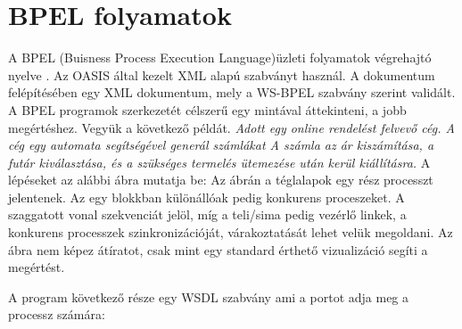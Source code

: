 \chapter{BPEL folyamatok}

A BPEL (Buisness Process Execution Language)üzleti folyamatok végrehajtó nyelve \cite{saraswathi2013oracle}.
Az OASIS által kezelt XML alapú szabványt használ. 
A dokumentum felépítésében egy XML dokumentum, mely a WS-BPEL szabvány szerint validált. A BPEL programok szerkezetét célszerű egy mintával áttekinteni, a jobb megértéshez. %
Vegyük a következő példát.  \textsl{Adott egy online rendelést felvevő cég. A cég egy automata segítségével generál számlákat A számla az ár kiszámítása, a futár kiválasztása, és a szükséges termelés ütemezése után kerül kiállításra.} A lépéseket az alábbi ábra mutatja be: %
Az ábrán a téglalapok egy rész processzt jelentenek. Az egy blokkban különállóak pedig konkurens proceszeket. A szaggatott vonal szekvenciát jelöl, míg a teli/sima pedig vezérlő linkek, a konkurens processzek szinkronizációját, várakoztatását lehet velük megoldani. Az ábra nem képez átíratot, csak mint egy standard érthető vizualizáció segíti a megértést. 

A program következő része egy WSDL szabvány ami a portot adja meg a processz számára:
\newpage

